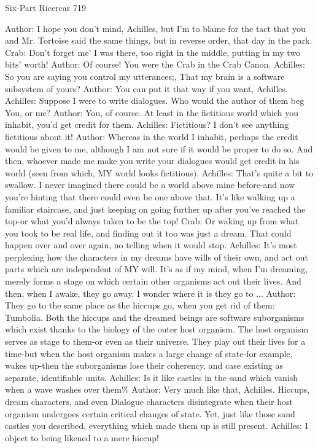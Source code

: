 Six-Part Ricercar                                                                        719

Author: I hope you don't mind, Achilles, but I'm to blame for the tact that you and Mr.
   Tortoise said the same things, but in reverse order, that day in the park.
Crab: Don't forget me' I was there, too right in the middle, putting in my two bits' worth!
Author: Of course! You were the Crab in the Crab Canon.
Achilles: So you are saying you control my utterances;, That my brain is a software
   subsystem of yours?
Author: You can put it that way if you want, Achilles.
Achilles: Suppose I were to write dialogues. Who would the author of them beg You, or
   me?
Author: You, of course. At least in the fictitious world which you inhabit, you'd get credit
   for them.
Achilles: Fictitious? I don't see anything fictitious about it!
Author: Whereas in the world I inhabit, perhaps the credit would be given to me,
   although I am not sure if it would be proper to do so. And then, whoever made me
   make you write your dialogues would get credit in his world (seen from which, MY
   world looks fictitious).
Achilles: That's quite a bit to swallow. I never imagined there could be a world above
   mine before-and now you're hinting that there could even be one above that. It's like
   walking up a familiar staircase, and just keeping on going further up after you've
   reached the top-or what you'd always taken to be the top!
Crab: Or waking up from what you took to be real life, and finding out it too was just a
   dream. That could happen over and over again, no telling when it would stop.
Achilles: It's most perplexing how the characters in my dreams have wills of their own,
   and act out parts which are independent of MY will. It's as if my mind, when I'm
   dreaming, merely forms a stage on which certain other organisms act out their lives.
   And then, when I awake, they go away. I wonder where it is they go to ...
Author: They go to the same place as the hiccups go, when you get rid of them:
   Tumbolia. Both the hiccups and the dreamed beings are software suborganisms which
   exist thanks to the biology of the outer host organism. The host organism serves as
   stage to them-or even as their universe. They play out their lives for a time-but when
   the host organism makes a large change of state-for example, wakes up-then the
   suborganisms lose their coherency, and case existing as separate, identifiable units.
Achilles: Is it like castles in the sand which vanish when a wave washes over them\%
Author: Very much like that, Achilles. Hiccups, dream characters, and even Dialogue
   characters disintegrate when their host organism undergoes certain critical changes of
   state. Yet, just like those sand castles you described, everything which made them up
   is still present.
Achilles: I object to being likened to a mere hiccup!




